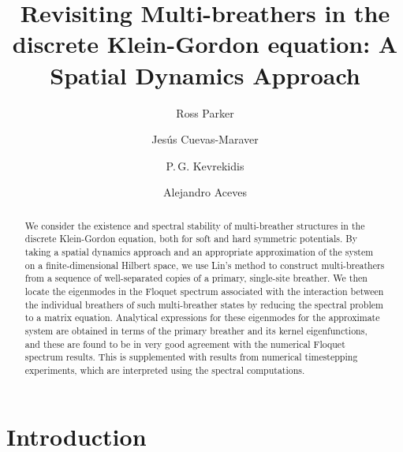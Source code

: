 \documentclass[12pt,reqno]{amsart}
\theoremstyle{definition}
\begin{document}
\title[Revisiting Multi-breathers in the discrete Klein-Gordon equation]{Revisiting Multi-breathers in the discrete Klein-Gordon equation: A Spatial Dynamics Approach}

\author{Ross Parker}
\address{Department of Mathematics, Southern Methodist University, 
Dallas, TX 75275, USA}

\author{Jes\'us Cuevas-Maraver}
\address{Grupo de F\'{\i}sica No Lineal, Departamento de F\'{\i}sica Aplicada I,
Universidad de Sevilla. Escuela Polit\'{e}cnica Superior, C/ Virgen de Africa, 7, 41011-Sevilla, Spain}
\address{Instituto de Matem\'{a}ticas de la Universidad de Sevilla (IMUS). Edificio
Celestino Mutis. Avda. Reina Mercedes s/n, 41012-Sevilla, Spain}

\author{P.\,G. Kevrekidis} 
\address{Department of Mathematics and Statistics, University of Massachusetts, Amherst MA 01003, USA}

\author{Alejandro Aceves}
\address{Department of Mathematics, Southern Methodist University, 
Dallas, TX 75275, USA}

\begin{abstract}
	We consider the existence and spectral stability of multi-breather structures in the discrete Klein-Gordon equation, both for soft and hard symmetric potentials. By taking a spatial dynamics approach and an appropriate approximation of the system on a finite-dimensional Hilbert space, we use Lin's method to construct multi-breathers from a sequence of well-separated copies of a primary, single-site breather. We then locate the eigenmodes in the Floquet spectrum associated with the interaction between the
	individual breathers of such multi-breather
	states by reducing the spectral problem to a matrix equation. Analytical expressions for these eigenmodes for the approximate system are obtained in terms of the primary breather and its kernel eigenfunctions, and these are found to be in very good agreement with the numerical Floquet spectrum results. This is supplemented with results from numerical timestepping experiments, which are interpreted using the spectral computations.
\end{abstract}

\maketitle

\section{Introduction}
\end{document}
